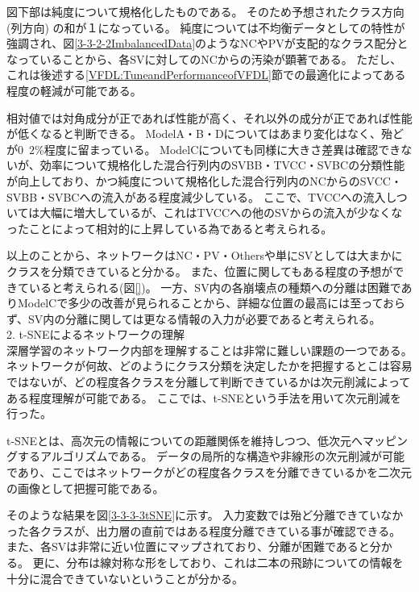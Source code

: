 図下部は純度について規格化したものである。
そのため予想されたクラス方向 (列方向) の和が１になっている。
純度については不均衡データとしての特性が強調され、図\ref{3-3-2-2ImbalancedData}のようなNCやPVが支配的なクラス配分となっていることから、各SVに対してのNCからの汚染が顕著である。
ただし、これは後述する\ref{VFDL:TuneandPerformanceofVFDL}節での最適化によってある程度の軽減が可能である。

相対値では対角成分が正であれば性能が高く、それ以外の成分が正であれば性能が低くなると判断できる。
ModelA・B・Dについてはあまり変化はなく、殆どが$0$~$2$\%程度に留まっている。
ModelCについても同様に大きさ差異は確認できないが、効率について規格化した混合行列内のSVBB・TVCC・SVBCの分類性能が向上しており、かつ純度について規格化した混合行列内のNCからのSVCC・SVBB・SVBCへの流入がある程度減少している。
ここで、TVCCへの流入しついては大幅に増大しているが、これはTVCCへの他のSVからの流入が少なくなったことによって相対的に上昇している為であると考えられる。

以上のことから、ネットワークはNC・PV・Othersや単にSVとしては大まかにクラスを分類できていると分かる。
また、位置に関してもある程度の予想ができていると考えられる(図\ref{})。
一方、SV内の各崩壊点の種類への分離は困難でありModelCで多少の改善が見られることから、詳細な位置の最高には至っておらず、SV内の分離に関しては更なる情報の入力が必要であると考えられる。\\

2. t-SNEによるネットワークの理解\\

深層学習のネットワーク内部を理解することは非常に難しい課題の一つである。
ネットワークが何故、どのようにクラス分類を決定したかを把握するとこは容易ではないが、どの程度各クラスを分離して判断できているかは次元削減によってある程度理解が可能である。
ここでは、t-SNEという手法を用いて次元削減を行った。

t-SNEとは、高次元の情報についての距離関係を維持しつつ、低次元へマッピングするアルゴリズムである。
データの局所的な構造や非線形の次元削減が可能であり、ここではネットワークがどの程度各クラスを分離できているかを二次元の画像として把握可能である。

そのような結果を図\ref{3-3-3-3tSNE}に示す。
入力変数では殆ど分離できていなかった各クラスが、出力層の直前ではある程度分離できている事が確認できる。
また、各SVは非常に近い位置にマップされており、分離が困難であると分かる。
更に、分布は線対称な形をしており、これは二本の飛跡についての情報を十分に混合できていないということが分かる。


